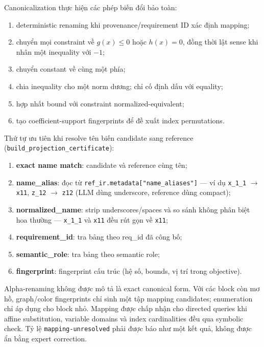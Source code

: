 \documentclass[11pt,a4paper]{article}
\begin{document}
Canonicalization thực hiện các phép biến đổi bảo toàn:

\begin{enumerate}
  \item deterministic renaming khi provenance/requirement ID xác định mapping;
  \item chuyển mọi constraint về \(g(x)\leq0\) hoặc \(h(x)=0\), đồng thời lật
  sense khi nhân một inequality với \(-1\);
  \item chuyển constant về cùng một phía;
  \item chia inequality cho một norm dương; chỉ cố định dấu với equality;
  \item hợp nhất bound với constraint normalized-equivalent;
  \item tạo coefficient-support fingerprints để đề xuất index permutations.
\end{enumerate}

Thứ tự ưu tiên khi resolve tên biến candidate sang reference (\texttt{build\_projection\_certificate}):

\begin{enumerate}
  \item \textbf{exact name match}: candidate và reference cùng tên;
  \item \textbf{name\_alias}: đọc từ \texttt{ref\_ir.metadata["name\_aliases"]} --- ví dụ \texttt{x\_1\_1} $\to$ \texttt{x11}, \texttt{z\_12} $\to$ \texttt{z12} (LLM dùng underscore, reference dùng compact);
  \item \textbf{normalized\_name}: strip underscores/spaces và so sánh không phân biệt hoa thường --- \texttt{x\_1\_1} và \texttt{x11} đều rút gọn về \texttt{x11};
  \item \textbf{requirement\_id}: tra bảng theo req\_id đã công bố;
  \item \textbf{semantic\_role}: tra bảng theo semantic role;
  \item \textbf{fingerprint}: fingerprint cấu trúc (hệ số, bounds, vị trí trong objective).
\end{enumerate}

Alpha-renaming không được mô tả là exact canonical form. Với các block còn mơ
hồ, graph/color fingerprints chỉ sinh một tập mapping candidates; enumeration
chỉ áp dụng cho block nhỏ. Mapping được chấp nhận cho directed queries khi
affine substitution, variable domains và index cardinalities đều qua symbolic
check. Tỷ lệ \texttt{mapping-unresolved} phải được báo như một kết quả, không
được ẩn bằng expert correction.
\end{document}
